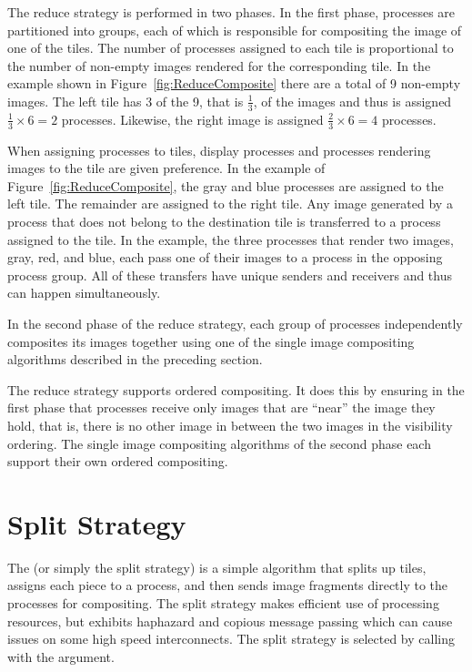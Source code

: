 The reduce strategy is performed in two phases.  In the first phase,
processes are partitioned into groups, each of which is responsible for
compositing the image of one of the tiles.  The number of processes
assigned to each tile is proportional to the number of non-empty images
rendered for the corresponding tile.  In the example shown in
Figure~\ref{fig:ReduceComposite} there are a total of 9 non-empty images.
The left tile has 3 of the 9, that is $\frac{1}{3}$, of the images and thus
is assigned $\frac{1}{3} \times 6 = 2$ processes.  Likewise, the right
image is assigned $\frac{2}{3} \times 6 = 4$ processes.

When assigning processes to tiles, display processes and processes rendering
images to the tile are given preference.  In the example of
Figure~\ref{fig:ReduceComposite}, the gray and blue processes are assigned
to the left tile.  The remainder are assigned to the right tile.  Any image
generated by a process that does not belong to the destination tile is
transferred to a process assigned to the tile.  In the example, the three
processes that render two images, gray, red, and blue, each pass one of
their images to a process in the opposing process group.  All of these
transfers have unique senders and receivers and thus can happen
simultaneously.

In the second phase of the reduce strategy, each group of processes
independently composites its images together using one of the single image
compositing algorithms described in the preceding section.

The reduce strategy supports ordered compositing.  It does this by ensuring
in the first phase that processes receive only images that are ``near'' the
image they hold, that is, there is no other image in between the two images
in the visibility ordering.  The single image compositing algorithms of the
second phase each support their own ordered compositing.


\section{Split Strategy}
\label{sec:Strategies:Split}


The  (or simply the split
strategy) is a simple algorithm that splits up tiles, assigns each piece to
a process, and then sends image fragments directly to the processes for
compositing.  The split strategy makes efficient use of processing
resources, but exhibits haphazard and copious message passing which can
cause issues on some high speed interconnects.  The split strategy is
selected by calling  with the
 argument.

